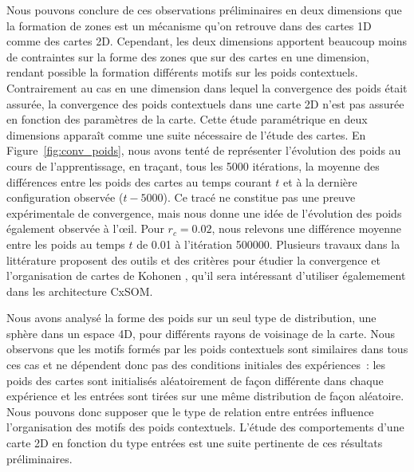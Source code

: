 \documentclass[../main]{subfiles}
\begin{document}
Nous pouvons conclure de ces observations préliminaires en deux dimensions que la formation de zones est un mécanisme qu'on retrouve dans des cartes 1D comme des cartes 2D.
Cependant, les deux dimensions apportent beaucoup moins de contraintes sur la forme des zones que sur des cartes en une dimension, rendant possible la formation différents motifs sur les poids contextuels. 
Contrairement au cas en une dimension dans lequel la convergence des poids était assurée, la convergence des poids contextuels dans une carte 2D n'est pas assurée en fonction des paramètres de la carte. Cette étude paramétrique en deux dimensions apparaît comme une suite nécessaire de l'étude des cartes.
En Figure~\ref{fig:conv_poids}, nous avons tenté de représenter l'évolution des poids au cours de l'apprentissage, en traçant, tous les 5000 itérations, la moyenne des différences entre les poids des cartes au temps courant $t$ et à la dernière configuration observée ($t - 5000$). Ce tracé ne constitue pas une preuve expérimentale de convergence, mais nous donne une idée de l'évolution des poids également observée à l'\oe{}il. Pour $r_c = 0.02$, nous relevons une différence moyenne entre les poids au temps $t$ de 0.01 à l'itération 500000.
Plusieurs travaux dans la littérature proposent des outils et des critères pour étudier la convergence et l'organisation de cartes de Kohonen \cite{Polani2001MeasuresFT, Breard2017EvaluatingSM, Tatoian2018SelfOrganizingMC}, qu'il sera intéressant d'utiliser égalemement dans les architecture CxSOM.

Nous avons analysé la forme des poids sur un seul type de distribution, une sphère dans un espace 4D, pour différents rayons de voisinage de la carte.
Nous observons que les motifs formés par les poids contextuels sont similaires dans tous ces cas et ne dépendent donc pas des conditions initiales des expériences~: les poids des cartes sont initialisés aléatoirement de façon différente dans chaque expérience et les entrées sont tirées sur une même distribution de façon aléatoire.
Nous pouvons donc supposer que le type de relation entre entrées influence l'organisation des motifs des poids contextuels. L'étude des comportements d'une carte 2D en fonction du type entrées est une suite pertinente de ces résultats préliminaires.
\end{document}
